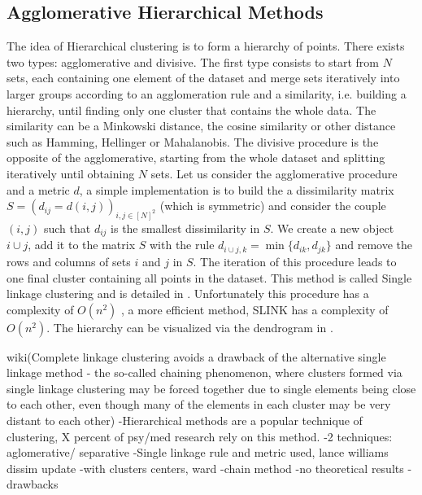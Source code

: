 \subsection{Agglomerative Hierarchical Methods}
The idea of Hierarchical clustering is to form a hierarchy of points. There exists two types: agglomerative and divisive. The first type consists to start from $N$ sets, each containing one element of the dataset and merge sets iteratively into larger groups according to an agglomeration rule and a similarity, i.e. building a hierarchy, until finding only one cluster that contains the whole data. The similarity can be a Minkowski distance, the cosine similarity or other distance such as Hamming, Hellinger or Mahalanobis.  The divisive procedure is the opposite of the agglomerative, starting from the whole dataset and splitting iteratively until obtaining $N$ sets. Let us consider the agglomerative procedure and a metric $d$, a simple implementation is to build the a dissimilarity matrix $S=(d_{ij}=d(i,j))_{i,j\in [N]^2}$ (which is symmetric) and consider the couple $(i,j)$ such that $d_{ij}$ is the smallest dissimilarity in $S$. We create a new object $i \cup j$, add it to the matrix $S$ with the rule $d_{i\cup j, k}=\min\{d_{ik},d_{jk}\}$ and remove the rows and columns of sets $i$ and $j$ in $S$. The iteration of this procedure leads to one final cluster containing all points in the dataset. This method is called Single linkage clustering \citep{Graham:1985:HMS:1435654.1436662} and is detailed in . Unfortunately this procedure has a complexity of $O(n^2)$ \citep{hierarchicalMurtagh}, a more efficient method, SLINK has a complexity of $O(n^2)$. The hierarchy can be visualized via the dendrogram in .


wiki(Complete linkage clustering avoids a drawback of the alternative single linkage method - the so-called chaining phenomenon, where clusters formed via single linkage clustering may be forced together due to single elements being close to each other, even though many of the elements in each cluster may be very distant to each other)
-Hierarchical methods are a popular technique of clustering, X percent of psy/med research rely on this method.
-2 techniques: aglomerative/ separative
-Single linkage rule and metric used, lance williams dissim update
-with clusters centers, ward
-chain method
-no theoretical results
-drawbacks

